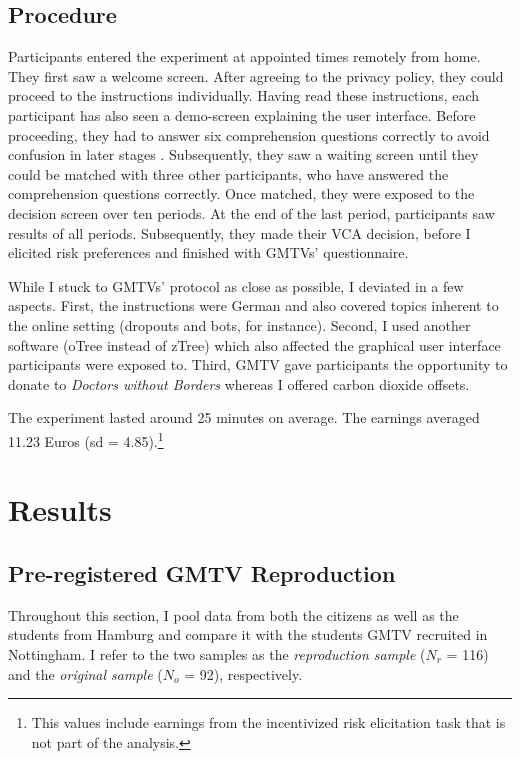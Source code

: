 \documentclass[
  authoryear,
  review,
  3p,
  onecolumn]{elsarticle}
\begin{document}
\hypertarget{sec-procedure}{%
\subsection{Procedure}\label{sec-procedure}}

Participants entered the experiment at appointed times remotely from
home. They first saw a welcome screen. After agreeing to the privacy
policy, they could proceed to the instructions individually. Having read
these instructions, each participant has also seen a demo-screen
explaining the user interface. Before proceeding, they had to answer six
comprehension questions correctly to avoid confusion in later stages
\citep{FerraroVossler2010}. Subsequently, they saw a waiting screen
until they could be matched with three other participants, who have
answered the comprehension questions correctly. Once matched, they were
exposed to the decision screen over ten periods. At the end of the last
period, participants saw results of all periods. Subsequently, they made
their VCA decision, before I elicited risk preferences
\citep{HoltLaury2002} and finished with GMTVs' questionnaire.

While I stuck to GMTVs' protocol as close as possible, I deviated in a
few aspects. First, the instructions were German and also covered topics
inherent to the online setting (dropouts and bots, for instance).
Second, I used another software (oTree instead of zTree) which also
affected the graphical user interface participants were exposed to.
Third, GMTV gave participants the opportunity to donate to \emph{Doctors
without Borders} whereas I offered carbon dioxide offsets.

The experiment lasted around 25 minutes on average. The earnings
averaged 11.23 Euros (sd = 4.85).\footnote{This values include earnings
  from the incentivized risk elicitation task that is not part of the
  analysis.}

\hypertarget{sec-results}{%
\section{Results}\label{sec-results}}

\hypertarget{sec-replication}{%
\subsection{Pre-registered GMTV Reproduction}\label{sec-replication}}

Throughout this section, I pool data from both the citizens as well as
the students from Hamburg and compare it with the students GMTV
recruited in Nottingham. I refer to the two samples as the
\emph{reproduction sample} (\(N_r\) = 116) and the \emph{original
sample} (\(N_o\) = 92), respectively.
\end{document}
